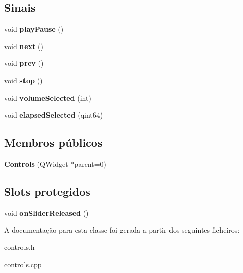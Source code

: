 \subsection*{Sinais}
\begin{DoxyCompactItemize}
\item 
\hypertarget{class_controls_afe7504ad0f381214c4183e5be814abc4}{void {\bfseries play\-Pause} ()}\label{class_controls_afe7504ad0f381214c4183e5be814abc4}

\item 
\hypertarget{class_controls_af74535d8202bfdb9049eb58f7d13e690}{void {\bfseries next} ()}\label{class_controls_af74535d8202bfdb9049eb58f7d13e690}

\item 
\hypertarget{class_controls_a166980f14fdc874aecbd5b96ee631888}{void {\bfseries prev} ()}\label{class_controls_a166980f14fdc874aecbd5b96ee631888}

\item 
\hypertarget{class_controls_abcd261c1a0fe72dc44eb49bebbe0931a}{void {\bfseries stop} ()}\label{class_controls_abcd261c1a0fe72dc44eb49bebbe0931a}

\item 
\hypertarget{class_controls_ab4219d5113b05a478c25c5c41203eaf7}{void {\bfseries volume\-Selected} (int)}\label{class_controls_ab4219d5113b05a478c25c5c41203eaf7}

\item 
\hypertarget{class_controls_ac44bbe30565ace7514dbb2d0337419a6}{void {\bfseries elapsed\-Selected} (qint64)}\label{class_controls_ac44bbe30565ace7514dbb2d0337419a6}

\end{DoxyCompactItemize}
\subsection*{Membros públicos}
\begin{DoxyCompactItemize}
\item 
\hypertarget{class_controls_a1f825cd40c51b25d483e5c11f052737c}{{\bfseries Controls} (Q\-Widget $\ast$parent=0)}\label{class_controls_a1f825cd40c51b25d483e5c11f052737c}

\end{DoxyCompactItemize}
\subsection*{Slots protegidos}
\begin{DoxyCompactItemize}
\item 
\hypertarget{class_controls_a45ba0a2beabcacf2065807adce607e73}{void {\bfseries on\-Slider\-Released} ()}\label{class_controls_a45ba0a2beabcacf2065807adce607e73}

\end{DoxyCompactItemize}


A documentação para esta classe foi gerada a partir dos seguintes ficheiros\-:\begin{DoxyCompactItemize}
\item 
controls.\-h\item 
controls.\-cpp\end{DoxyCompactItemize}
